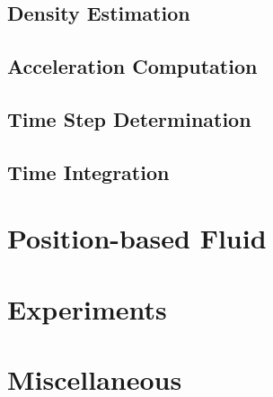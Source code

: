\documentclass[
	11pt, 
	DIV10,
	ngerman,
	a4paper, 
	oneside, 
	headings=normal, 
	captions=tableheading,
	final, 
	numbers=noenddot
]{scrartcl}
\begin{document}
\subsection{Density Estimation}
\subsection{Acceleration Computation}
\subsection{Time Step Determination}
\subsection{Time Integration}

\section{Position-based Fluid}
\label{sec3}
\section{Experiments}
\label{sec4}
\section{Miscellaneous}
\label{sec5}

% 
% 
\end{document}
